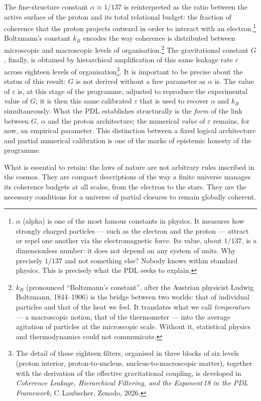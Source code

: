 \documentclass[11pt, a4paper, openright]{book}
\begin{document}
The fine-structure constant $\alpha \approx 1/137$ is reinterpreted as the ratio between the active surface of the proton and its total relational budget: the fraction of coherence that the proton projects outward in order to interact with an electron.\footnote{%
  $\alpha$ (alpha) is one of the most famous constants in physics. It measures how strongly charged particles — such as the electron and the proton — attract or repel one another via the electromagnetic force. Its value, about $1/137$, is a dimensionless number: it does not depend on any system of units. Why precisely $1/137$ and not something else? Nobody knows within standard physics. This is precisely what the PDL seeks to explain.}
Boltzmann’s constant $k_B$ encodes the way coherence is distributed between microscopic and macroscopic levels of organisation.\footnote{%
  $k_B$ (pronounced “Boltzmann's constant”, after the Austrian physicist Ludwig Boltzmann, 1844–1906) is the bridge between two worlds: that of individual particles and that of the heat we feel. It translates what we call \emph{temperature} — a macroscopic notion, that of the thermometer — into the average agitation of particles at the microscopic scale. Without it, statistical physics and thermodynamics could not communicate.}
The gravitational constant $G$, finally, is obtained by hierarchical amplification of this same leakage rate $\varepsilon$ across eighteen levels of organisation\footnote{The detail of these eighteen filters, organised in three blocks of six levels (proton interior, proton-to-nucleus, nucleus-to-macroscopic matter), together with the derivation of the effective gravitational coupling, is developed in \textit{Coherence Leakage, Hierarchical Filtering, and the Exponent\,18 in the PDL Framework}, C.\,Laubscher, Zenodo, 2026.}. It is important to be precise about the status of this result: $G$ is not derived without a free parameter as $\alpha$ is. The value of $\varepsilon$ is, at this stage of the programme, adjusted to reproduce the experimental value of $G$; it is then this same calibrated $\varepsilon$ that is used to recover $\alpha$ and $k_B$ simultaneously. What the PDL establishes structurally is the \emph{form} of the link between $G$, $\alpha$ and the proton architecture; the numerical \emph{value} of $\varepsilon$ remains, for now, an empirical parameter. This distinction between a fixed logical architecture and partial numerical calibration is one of the marks of epistemic honesty of the programme.

\medskip

What is essential to retain: the laws of nature are not arbitrary rules inscribed in the cosmos. They are compact descriptions of the way a finite universe manages its coherence budgets at all scales, from the electron to the stars. They are the necessary conditions for a universe of partial closures to remain globally coherent.
\end{document}
